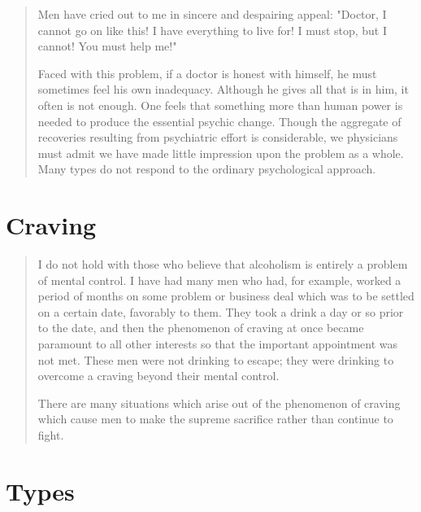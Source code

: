 \begin{quote}
Men have cried out to me in sincere and despairing appeal: 
"Doctor, I cannot go on like this! I have everything to live for! I must stop, but I cannot! You must help me!"

Faced with this problem, if a doctor is honest with himself, he must sometimes feel his own inadequacy. 
Although he gives all that is in him, it often is not enough. 
One feels that something more than human power is needed to produce the essential psychic change. 
Though the aggregate of recoveries resulting from psychiatric effort is considerable, we physicians must admit we have made little impression upon the problem as a whole. 
Many types do not respond to the ordinary psychological approach.
\end{quote}


\section{Craving}

\begin{quote}
I do not hold with those who believe that alcoholism is entirely a problem of mental control. 
I have had many men who had, for example, worked a period of months on some problem or business deal which was to be settled on a certain date, favorably to them. 
They took a drink a day or so prior to the date, and then the phenomenon of craving at once became paramount to all other interests so that the important appointment was not met. 
These men were not drinking to escape; 
they were drinking to overcome a craving beyond their mental control.

There are many situations which arise out of the phenomenon of craving which cause men to make the supreme sacrifice rather than continue to fight.
\end{quote}


\section{Types}

